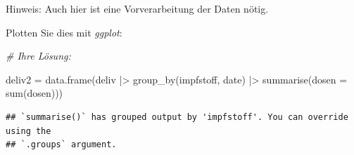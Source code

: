 \documentclass[
]{article}
\newenvironment{Shaded}{\begin{snugshade}}{\end{snugshade}}
\newcommand{\AttributeTok}[1]{\textcolor[rgb]{0.77,0.63,0.00}{#1}}
\newcommand{\CommentTok}[1]{\textcolor[rgb]{0.56,0.35,0.01}{\textit{#1}}}
\newcommand{\FunctionTok}[1]{\textcolor[rgb]{0.00,0.00,0.00}{#1}}
\newcommand{\NormalTok}[1]{#1}
\newcommand{\OtherTok}[1]{\textcolor[rgb]{0.56,0.35,0.01}{#1}}
\newcommand{\SpecialCharTok}[1]{\textcolor[rgb]{0.00,0.00,0.00}{#1}}
\begin{document}
Hinweis: Auch hier ist eine Vorverarbeitung der Daten nötig.

Plotten Sie dies mit \emph{ggplot}:

\begin{Shaded}
\begin{Highlighting}[]
\CommentTok{\# Ihre Lösung:}

\NormalTok{deliv2 }\OtherTok{=} \FunctionTok{data.frame}\NormalTok{(deliv }\SpecialCharTok{|\textgreater{}} \FunctionTok{group\_by}\NormalTok{(impfstoff, date) }\SpecialCharTok{|\textgreater{}} \FunctionTok{summarise}\NormalTok{(}\AttributeTok{dosen =} \FunctionTok{sum}\NormalTok{(dosen)))}
\end{Highlighting}
\end{Shaded}

\begin{verbatim}
## `summarise()` has grouped output by 'impfstoff'. You can override using the
## `.groups` argument.
\end{verbatim}
\end{document}

